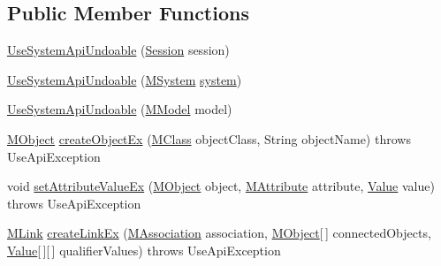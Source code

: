 \subsection*{Public Member Functions}
\begin{DoxyCompactItemize}
\item 
\hyperlink{classorg_1_1tzi_1_1use_1_1api_1_1impl_1_1_use_system_api_undoable_a13c3dd17e58efaca10663a94904b1c91}{Use\-System\-Api\-Undoable} (\hyperlink{classorg_1_1tzi_1_1use_1_1main_1_1_session}{Session} session)
\item 
\hyperlink{classorg_1_1tzi_1_1use_1_1api_1_1impl_1_1_use_system_api_undoable_abcc613ebb0a03fbeeb99aa6cccb01be4}{Use\-System\-Api\-Undoable} (\hyperlink{classorg_1_1tzi_1_1use_1_1uml_1_1sys_1_1_m_system}{M\-System} \hyperlink{classorg_1_1tzi_1_1use_1_1api_1_1_use_system_api_aabe59f3d91d8ec4b257ec0fce2339a28}{system})
\item 
\hyperlink{classorg_1_1tzi_1_1use_1_1api_1_1impl_1_1_use_system_api_undoable_a0adbd004d0858f79a4af9f7482e1b915}{Use\-System\-Api\-Undoable} (\hyperlink{classorg_1_1tzi_1_1use_1_1uml_1_1mm_1_1_m_model}{M\-Model} model)
\item 
\hyperlink{interfaceorg_1_1tzi_1_1use_1_1uml_1_1sys_1_1_m_object}{M\-Object} \hyperlink{classorg_1_1tzi_1_1use_1_1api_1_1impl_1_1_use_system_api_undoable_a1b007ab258e6735e66d158bee7fd0e7a}{create\-Object\-Ex} (\hyperlink{interfaceorg_1_1tzi_1_1use_1_1uml_1_1mm_1_1_m_class}{M\-Class} object\-Class, String object\-Name)  throws Use\-Api\-Exception 
\item 
void \hyperlink{classorg_1_1tzi_1_1use_1_1api_1_1impl_1_1_use_system_api_undoable_a97b45092fe28410d1b2047deff1f8048}{set\-Attribute\-Value\-Ex} (\hyperlink{interfaceorg_1_1tzi_1_1use_1_1uml_1_1sys_1_1_m_object}{M\-Object} object, \hyperlink{classorg_1_1tzi_1_1use_1_1uml_1_1mm_1_1_m_attribute}{M\-Attribute} attribute, \hyperlink{classorg_1_1tzi_1_1use_1_1uml_1_1ocl_1_1value_1_1_value}{Value} value)  throws Use\-Api\-Exception 
\item 
\hyperlink{interfaceorg_1_1tzi_1_1use_1_1uml_1_1sys_1_1_m_link}{M\-Link} \hyperlink{classorg_1_1tzi_1_1use_1_1api_1_1impl_1_1_use_system_api_undoable_a5c473d8efb442f27bbd9504bd92ed1fd}{create\-Link\-Ex} (\hyperlink{interfaceorg_1_1tzi_1_1use_1_1uml_1_1mm_1_1_m_association}{M\-Association} association, \hyperlink{interfaceorg_1_1tzi_1_1use_1_1uml_1_1sys_1_1_m_object}{M\-Object}\mbox{[}$\,$\mbox{]} connected\-Objects, \hyperlink{classorg_1_1tzi_1_1use_1_1uml_1_1ocl_1_1value_1_1_value}{Value}\mbox{[}$\,$\mbox{]}\mbox{[}$\,$\mbox{]} qualifier\-Values)  throws Use\-Api\-Exception 

\end{DoxyCompactItemize}
